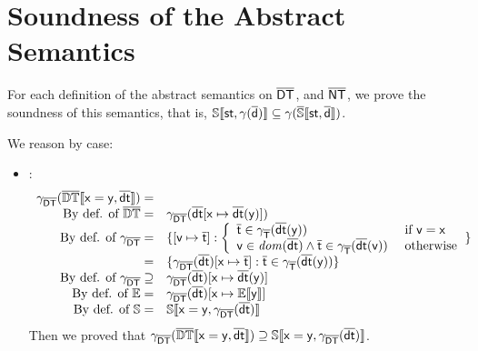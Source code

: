 \documentclass{llncs}
\begin{document}
\section{Soundness of the Abstract Semantics}
For each definition of the abstract semantics on $\mathsf{\overline{DT}}$, and $\mathsf{\overline{NT}}$, we prove the soundness of this semantics, that is, $\mathbb{S}\llbracket \mathtt{\mathsf{st}, \gamma(\mathsf{\overline{d}})} \rrbracket \subseteq \gamma(\mathbb{\overline{\mathit{\mathbb{S}}}}\llbracket \mathtt{\mathsf{st}, \mathsf{\overline{d}}} \rrbracket)$.

\begin{lemma}
\label{lemma:dtsound}
We reason by case:
\begin{itemize}
\item {}: 
\[
\begin{array}{rl}
\gamma_{\mathsf{\overline{DT}}} (\mathbb{\overline{\mathit{\mathbb{DT}}}}\llbracket \mathtt{\mathsf{x = y}, \mathsf{\overline{dt}}} \rrbracket)= &\\
\textrm{By def. of } \overline{\mathit{\mathbb{DT}}} = & \gamma_{\mathsf{\overline{DT}}} (\mathsf{\overline{dt}}[\mathsf{x} \mapsto \mathsf{\overline{dt}}(\mathsf{y})])\\
\textrm{By def. of } \gamma_{\mathsf{\overline{DT}}} = & \{[\mathsf{v} \mapsto \mathsf{\overline{t}}] : \left\{
\begin{array}{ll}
\mathsf{\overline{t}} \in \gamma_{\mathsf{\overline{T}}}(\mathsf{\overline{dt}}(\mathsf{y})) &\textrm{ if }\mathsf{v}=\mathsf{x}\\
\mathsf{v} \in \mathit{dom}(\mathsf{\overline{dt}}) \land \mathsf{\overline{t}} \in \gamma_{\mathsf{\overline{T}}}(\mathsf{\overline{dt}}(\mathsf{v})) &\textrm{ otherwise}
\end{array}
\right.
\}\\
 = & \{\gamma_{\mathsf{\overline{DT}}}(\mathsf{\overline{dt}})[\mathsf{x} \mapsto \mathsf{\overline{t}}] : \mathsf{\overline{t}} \in \gamma_{\mathsf{\overline{T}}}(\mathsf{\overline{dt}}(\mathsf{y}))\}\\
\textrm{By def. of } \gamma_{\mathsf{\overline{DT}}} \supseteq & \gamma_{\mathsf{\overline{DT}}}(\mathsf{\overline{dt}})[\mathsf{x} \mapsto \mathsf{\overline{dt}}(\mathsf{y})]\\
\textrm{By def. of }\mathit{\mathbb{E}} = & \gamma_{\mathsf{\overline{DT}}}(\mathsf{\overline{dt}})[\mathsf{x} \mapsto \mathbb{E}\llbracket \mathtt{\mathsf{y}} \rrbracket]\\
\textrm{By def. of }\mathit{\mathbb{S}} = & \mathbb{S}\llbracket \mathtt{\mathsf{x = y}, \gamma_{\mathsf{\overline{DT}}}(\mathsf{\overline{dt}})} \rrbracket\\
\end{array}
\]
Then we proved that $\gamma_{\mathsf{\overline{DT}}} (\mathbb{\overline{\mathit{\mathbb{DT}}}}\llbracket \mathtt{\mathsf{x = y}, \mathsf{\overline{dt}}} \rrbracket) \supseteq \mathbb{S}\llbracket \mathtt{\mathsf{x = y}, \gamma_{\mathsf{\overline{DT}}}(\mathsf{\overline{dt}})} \rrbracket$.


\end{itemize}
\end{lemma}
\end{document}
